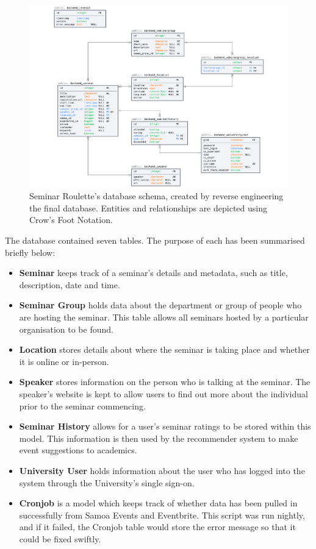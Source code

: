 \documentclass{l4proj}
\begin{document}
\begin{figure}[htb]
    \centering
    \includegraphics[width=0.70\linewidth]{images/database_schema_light.pdf}    
    \caption{Seminar Roulette's database schema, created by reverse engineering the final database. Entities and relationships are depicted using Crow's Foot Notation.}
    \label{fig:database_schema} 
\end{figure}

The database contained seven tables. The purpose of each has been summarised briefly below:

\begin{itemize}
    \item \textbf{Seminar} keeps track of a seminar's details and metadata, such as title, description, date and time. 
    \item \textbf{Seminar Group} holds data about the department or group of people who are hosting the seminar. This table allows all seminars hosted by a particular organisation to be found.
    \item \textbf{Location} stores details about where the seminar is taking place and whether it is online or in-person.
    \item \textbf{Speaker} stores information on the person who is talking at the seminar. The speaker's website is kept to allow users to find out more about the individual prior to the seminar commencing.
    \item \textbf{Seminar History} allows for a user's seminar ratings to be stored within this model. This information is then used by the recommender system to make event suggestions to academics.
    \item \textbf{University User} holds information about the user who has logged into the system through the University's single sign-on.
    \item \textbf{Cronjob} is a model which keeps track of whether data has been pulled in successfully from Samoa Events and Eventbrite. This script was run nightly, and if it failed, the Cronjob table would store the error message so that it could be fixed swiftly.
\end{itemize}
\end{document}
